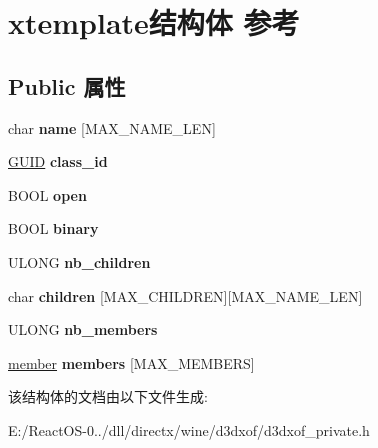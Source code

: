 \hypertarget{structxtemplate}{}\section{xtemplate结构体 参考}
\label{structxtemplate}
\subsection*{Public 属性}
\begin{DoxyCompactItemize}
\item 
\mbox{\label{structxtemplate_a8621bac1f65ad9134345f40d3e4b0c5e}} 
char {\bfseries name} \mbox{[}M\+A\+X\+\_\+\+N\+A\+M\+E\+\_\+\+L\+EN\mbox{]}
\item 
\mbox{\label{structxtemplate_aceb543a74e33e90cba5a9fe35a797fc7}} 
\hyperlink{interface_g_u_i_d}{G\+U\+ID} {\bfseries class\+\_\+id}
\item 
\mbox{\label{structxtemplate_a0bec9dbcf613b94f298234f9021c7ca2}} 
B\+O\+OL {\bfseries open}
\item 
\mbox{\label{structxtemplate_a504bcfce79a4b8275731c18abf55671e}} 
B\+O\+OL {\bfseries binary}
\item 
\mbox{\label{structxtemplate_a37b2cf9efd794c47d337cb754c9ed274}} 
U\+L\+O\+NG {\bfseries nb\+\_\+children}
\item 
\mbox{\label{structxtemplate_ac140e3e838854f307f4d0f4bf6b3d045}} 
char {\bfseries children} \mbox{[}M\+A\+X\+\_\+\+C\+H\+I\+L\+D\+R\+EN\mbox{]}\mbox{[}M\+A\+X\+\_\+\+N\+A\+M\+E\+\_\+\+L\+EN\mbox{]}
\item 
\mbox{\label{structxtemplate_a188790e50a8263d5bec1921e8d7aabe8}} 
U\+L\+O\+NG {\bfseries nb\+\_\+members}
\item 
\mbox{\label{structxtemplate_a0d154f41cc179c032842750f91fd3687}} 
\hyperlink{structmember}{member} {\bfseries members} \mbox{[}M\+A\+X\+\_\+\+M\+E\+M\+B\+E\+RS\mbox{]}
\end{DoxyCompactItemize}


该结构体的文档由以下文件生成\+:\begin{DoxyCompactItemize}
\item 
E\+:/\+React\+O\+S-\/0../dll/directx/wine/d3dxof/d3dxof\+\_\+private.\+h\end{DoxyCompactItemize}
